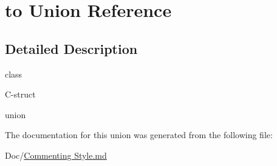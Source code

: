 \hypertarget{classto}{}\section{to Union Reference}
\label{classto}


\subsection{Detailed Description}
class

C-\/struct

union 

The documentation for this union was generated from the following file\+:\begin{DoxyCompactItemize}
\item 
Doc/\hyperlink{Commenting_01Style_8md}{Commenting Style.\+md}\end{DoxyCompactItemize}
